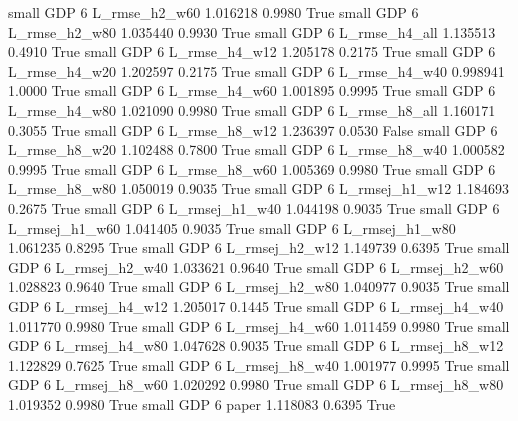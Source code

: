      small      GDP                 6  L_rmse_h2_w60   1.016218      0.9980    True
     small      GDP                 6  L_rmse_h2_w80   1.035440      0.9930    True
     small      GDP                 6  L_rmse_h4_all   1.135513      0.4910    True
     small      GDP                 6  L_rmse_h4_w12   1.205178      0.2175    True
     small      GDP                 6  L_rmse_h4_w20   1.202597      0.2175    True
     small      GDP                 6  L_rmse_h4_w40   0.998941      1.0000    True
     small      GDP                 6  L_rmse_h4_w60   1.001895      0.9995    True
     small      GDP                 6  L_rmse_h4_w80   1.021090      0.9980    True
     small      GDP                 6  L_rmse_h8_all   1.160171      0.3055    True
     small      GDP                 6  L_rmse_h8_w12   1.236397      0.0530   False
     small      GDP                 6  L_rmse_h8_w20   1.102488      0.7800    True
     small      GDP                 6  L_rmse_h8_w40   1.000582      0.9995    True
     small      GDP                 6  L_rmse_h8_w60   1.005369      0.9980    True
     small      GDP                 6  L_rmse_h8_w80   1.050019      0.9035    True
     small      GDP                 6 L_rmsej_h1_w12   1.184693      0.2675    True
     small      GDP                 6 L_rmsej_h1_w40   1.044198      0.9035    True
     small      GDP                 6 L_rmsej_h1_w60   1.041405      0.9035    True
     small      GDP                 6 L_rmsej_h1_w80   1.061235      0.8295    True
     small      GDP                 6 L_rmsej_h2_w12   1.149739      0.6395    True
     small      GDP                 6 L_rmsej_h2_w40   1.033621      0.9640    True
     small      GDP                 6 L_rmsej_h2_w60   1.028823      0.9640    True
     small      GDP                 6 L_rmsej_h2_w80   1.040977      0.9035    True
     small      GDP                 6 L_rmsej_h4_w12   1.205017      0.1445    True
     small      GDP                 6 L_rmsej_h4_w40   1.011770      0.9980    True
     small      GDP                 6 L_rmsej_h4_w60   1.011459      0.9980    True
     small      GDP                 6 L_rmsej_h4_w80   1.047628      0.9035    True
     small      GDP                 6 L_rmsej_h8_w12   1.122829      0.7625    True
     small      GDP                 6 L_rmsej_h8_w40   1.001977      0.9995    True
     small      GDP                 6 L_rmsej_h8_w60   1.020292      0.9980    True
     small      GDP                 6 L_rmsej_h8_w80   1.019352      0.9980    True
     small      GDP                 6          paper   1.118083      0.6395    True

